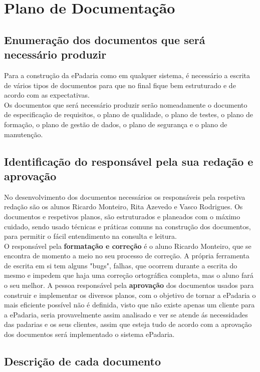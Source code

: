 \chapter{Plano de Documentação}
\label{plano_de_documentacao}

\section{Enumeração dos documentos que será necessário produzir}
Para a construção da ePadaria como em qualquer sistema, é necessário a escrita de vários tipos de documentos para que no final fique bem estruturado e de acordo com as expectativas.\\
Os documentos que será necessário produzir serão nomeadamente o documento de especificação de requisitos, o plano de qualidade, o plano de testes, o plano de formação, o plano de gestão de dados, o plano de segurança e o plano de manutenção.
\section{Identificação do responsável pela sua redação e aprovação}
No desenvolvimento dos documentos necessários os responsáveis pela respetiva redação são os alunos Ricardo Monteiro, Rita Azevedo e Vasco Rodrigues. Os documentos e respetivos planos, são estruturados e planeados com o máximo cuidado, sendo usado técnicas e práticas comuns na construção dos documentos, para permitir o fácil entendimento na consulta e leitura.\\
O responsável pela \textbf{formatação e correção} é o aluno Ricardo Monteiro, que se encontra de momento a meio no seu processo de correção. A própria ferramenta de escrita em si tem alguns "bugs", falhas, que ocorrem durante a escrita do mesmo e impedem que haja uma correção ortográfica completa, mas o aluno fará o seu melhor.
A pessoa responsável pela \textbf{aprovação} dos documentos usados para construir e implementar os diversos planos, com o objetivo de tornar a ePadaria o mais eficiente possível não é definida, visto que não existe apenas um cliente para a ePadaria, seria provavelmente assim analisado e ver se atende ás necessidades das padarias e os seus clientes, assim que esteja tudo de acordo com a aprovação dos documentos será implementado o sistema ePadaria.


\section{Descrição de cada documento}
